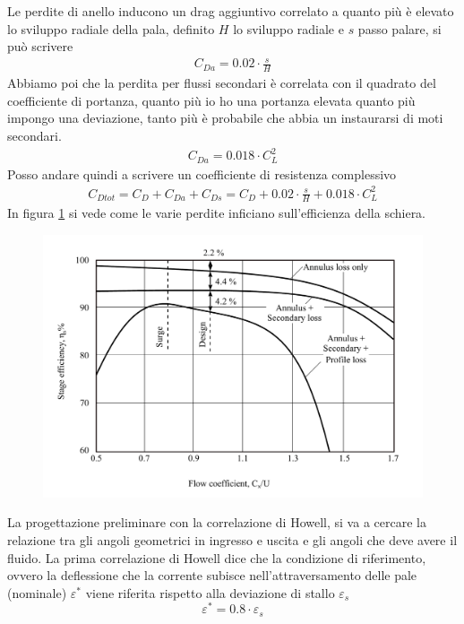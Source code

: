 Le perdite di anello inducono un drag aggiuntivo correlato a quanto più è elevato lo sviluppo radiale della pala, definito $H$ lo sviluppo radiale e $s$ passo palare, si può scrivere
\begin{align*}
C_{Da} = 0.02 \cdot \frac{s}{H}
\end{align*}
Abbiamo poi che la perdita per flussi secondari è correlata con il quadrato del coefficiente di portanza, quanto più io ho una portanza elevata quanto più impongo una deviazione, tanto più è probabile che abbia un instaurarsi di moti secondari.
\begin{align*}
C_{Da} = 0.018 \cdot C_L^2
\end{align*}
Posso andare quindi a scrivere un coefficiente di resistenza complessivo
\begin{align*}
C_{Dtot} = C_D + C_{Da} + C_{Ds} = C_D + 0.02 \cdot \frac{s}{H} + 0.018 \cdot C_L^2
\end{align*}
In figura \ref{fig:ComprStageLoss} si vede come le varie perdite inficiano sull'efficienza della schiera.
\begin{figure}
\centering
  \includegraphics[width=\textwidth]{fig/ComprStageLoss.pdf}
\caption{}
\label{fig:ComprStageLoss}
\end{figure}
La progettazione preliminare con la correlazione di Howell, si va a cercare la relazione tra gli angoli geometrici in ingresso e uscita e gli angoli che deve avere il fluido. La prima correlazione di Howell dice che la condizione di riferimento, ovvero la deflessione che la corrente subisce nell'attraversamento delle pale (nominale) $\varepsilon^*$ viene riferita rispetto alla deviazione di stallo $\varepsilon_s$
\begin{equation}
\varepsilon^* = 0.8 \cdot \varepsilon_s
\end{equation}
